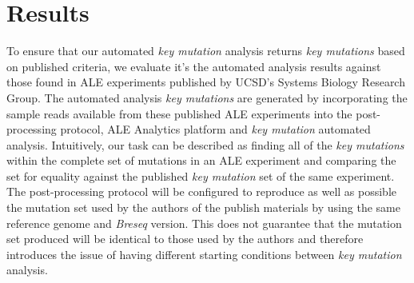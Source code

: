\documentclass[12pt,final,masters,chapterheads]{ucsd}  %
\begin{document}
\section{Results}

%
%

To ensure that our automated \textit{key mutation} analysis returns \textit{key mutations} based on published criteria, we evaluate it's the automated analysis results against those found in ALE experiments published by UCSD's Systems Biology Research Group. The automated analysis \textit{key mutations} are generated by incorporating the sample reads available from these published ALE experiments into the post-processing protocol, ALE Analytics platform and \textit{key mutation} automated analysis. Intuitively, our task can be described as finding all of the \textit{key mutations} within the complete set of mutations in an ALE experiment and comparing the set for equality against the published \textit{key mutation} set of the same experiment. The post-processing protocol will be configured to reproduce as well as possible the mutation set used by the authors of the publish materials by using the same reference genome and \textit{Breseq} version. This does not guarantee that the mutation set produced will be identical to those used by the authors and therefore introduces the issue of having different starting conditions between \textit{key mutation} analysis.

%
%
\end{document}
